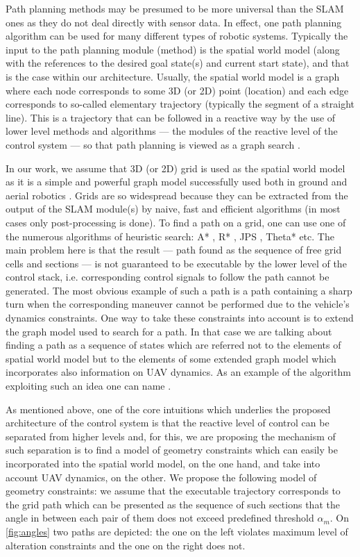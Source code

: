 \documentclass[review]{elsarticle}
\begin{document}
Path planning methods may be presumed to be more universal than the SLAM ones as they do not deal directly with sensor data. In effect, one path planning algorithm can be used for many different types of robotic systems. Typically the input to the path planning module (method) is the spatial world model (along with the references to the desired goal state(s) and current start state), and that is the case within our architecture. Usually, the spatial world model is a graph where each node corresponds to some 3D (or 2D) point (location) and each edge corresponds to so-called elementary trajectory (typically the segment of a straight line). This is a trajectory that can be followed in a reactive way by the use of lower level methods and algorithms --- the modules of the reactive level of the control system --- so that path planning is viewed as a graph search \cite{Likhachev2008}.

In our work, we assume that 3D (or 2D) grid \cite{Yap2002} is used as the spatial world model as it is a simple and powerful graph model successfully used both in ground \cite{Elfes1989} and aerial robotics \cite{Filippis2012}. Grids are so widespread because they can be extracted from the output of the SLAM module(s) by naive, fast and efficient algorithms (in most cases only post-processing is done). To find a path on a grid, one can use one of the numerous algorithms of heuristic search: A* \cite{Hart1968}, R* \cite{Likhacjev2008}, JPS \cite{Harabor2011}, Theta* \cite{Nash2007} etc. The main problem here is that the result --- path found as the sequence of free grid cells and sections --- is not guaranteed to be executable by the lower level of the control stack, i.e. corresponding control signals to follow the path cannot be generated. The most obvious example of such a path is a path containing a sharp turn when the corresponding maneuver cannot be performed due to the vehicle's dynamics constraints. One way to take these constraints into account is to extend the graph model used to search for a path. In that case we are talking about finding a path as a sequence of states which are referred not to the elements of spatial world model but to the elements of some extended graph model which incorporates also information on UAV dynamics. As an example of the algorithm exploiting such an idea one can name \cite{Kuwata2009,Kothari2013}.

As mentioned above, one of the core intuitions which underlies the proposed architecture of the control system is that the reactive level of control can be separated from higher levels and, for this, we are proposing the mechanism of such separation is to find a model of geometry constraints which can easily be incorporated into the spatial world model, on the one hand, and take into account UAV dynamics, on the other. We propose the following model of geometry constraints: we assume that the executable trajectory corresponds to the grid path which can be presented as the sequence of such sections that the angle in between each pair of them does not exceed predefined threshold $\alpha_m$. On \autoref{fig:angles} two paths are depicted: the one on the left violates maximum level of alteration constraints and the one on the right does not.
\end{document}
